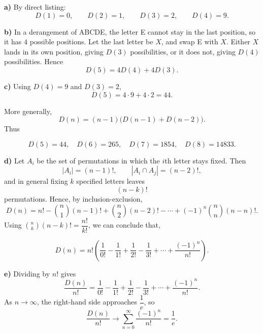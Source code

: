 \begin{solution}
\textbf{a)} By direct listing:
\[
D(1)=0,\qquad D(2)=1,\qquad D(3)=2,\qquad D(4)=9.
\]

\textbf{b)} In a derangement of ABCDE, the letter E cannot stay in the last position, so it has $4$ possible positions. Let the last letter be $X$, and swap E with $X$.
Either $X$ lands in its own position, giving $D(3)$ possibilities, or it does not, giving $D(4)$ possibilities. Hence
\[
D(5)=4D(4)+4D(3).
\]

\textbf{c)} Using $D(4)=9$ and $D(3)=2$,
\[
D(5)=4\cdot 9+4\cdot 2=44.
\]

More generally,
\[
D(n)=(n-1)\bigl(D(n-1)+D(n-2)\bigr).
\]
Thus

\[
\boxed{D(5)=44,\quad D(6)=265,\quad D(7)=1854,\quad D(8)=14833.}
\]

\textbf{d)} Let $A_i$ be the set of permutations in which the $i$th letter stays fixed. Then
\[
|A_i|=(n-1)!,
\qquad
|A_i\cap A_j|=(n-2)!,
\]
and in general fixing $k$ specified letters leaves
\[
(n-k)!
\]
permutations. Hence, by inclusion-exclusion,
\[
D(n)=n!-\binom{n}{1}(n-1)!+\binom{n}{2}(n-2)!-\cdots+(-1)^n\binom{n}{n}(n-n)!.
\]
Using $\binom{n}{k}(n-k)!=\dfrac{n!}{k!}$, we can conclude that,

\[
\boxed{
D(n)=n!\left(\frac{1}{0!}-\frac{1}{1!}+\frac{1}{2!}-\frac{1}{3!}+\cdots+\frac{(-1)^n}{n!}\right).
}
\]

\textbf{e)} Dividing by $n!$ gives
\[
\frac{D(n)}{n!}
=
\frac{1}{0!}-\frac{1}{1!}+\frac{1}{2!}-\frac{1}{3!}+\cdots+\frac{(-1)^n}{n!}.
\]
As $n\to\infty$, the right-hand side approaches $\dfrac1e$, so
\[
\boxed{\frac{D(n)}{n!}\to \sum_{n=0}^{\infty} \frac{(-1)^n}{n!} = \frac1e.}
\]
\end{solution}

